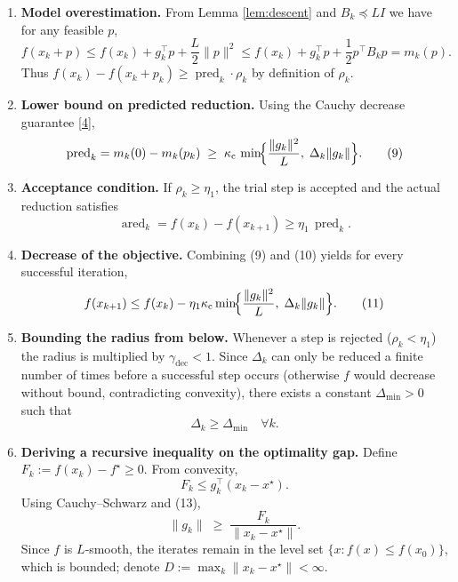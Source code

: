 \documentclass{article}
\begin{document}
\begin{enumerate}
\item[Step 1.] \textbf{Model overestimation.}  
From Lemma \ref{lem:descent} and $B_k\preceq L I$ we have for any feasible $p$,
\[
f(x_k+p)\le f(x_k)+g_k^{\top}p+\frac{L}{2}\|p\|^{2}
               \le f(x_k)+g_k^{\top}p+\frac12 p^{\top}B_k p
               = m_k(p).
\tag{8}
\]
Thus $f(x_k)-f(x_k+p_k)\ge \operatorname{pred}_k\cdot\rho_k$ by definition of $\rho_k$.

\item[Step 2.] \textbf{Lower bound on predicted reduction.}  
Using the Cauchy decrease guarantee \eqref{4},
\[
\operatorname{pred}_k
= m_k(0)-m_k(p_k)
\;\ge\; \kappa_{\mathrm{c}}\,
\min\!\Bigl\{\frac{\|g_k\|^{2}}{L},\;\Delta_k\|g_k\|\Bigr\}.
\tag{9}
\]

\item[Step 3.] \textbf{Acceptance condition.}  
If $\rho_k\ge \eta_1$, the trial step is accepted and the actual reduction satisfies
\[
\operatorname{ared}_k
= f(x_k)-f(x_{k+1})
\ge \eta_1\,\operatorname{pred}_k.
\tag{10}
\]

\item[Step 4.] \textbf{Decrease of the objective.}  
Combining (9) and (10) yields for every successful iteration,
\[
f(x_{k+1})\le f(x_k)-\eta_1\kappa_{\mathrm{c}}
\min\!\Bigl\{\frac{\|g_k\|^{2}}{L},\;\Delta_k\|g_k\|\Bigr\}.
\tag{11}
\]

\item[Step 5.] \textbf{Bounding the radius from below.}  
Whenever a step is rejected ($\rho_k<\eta_1$) the radius is multiplied by $\gamma_{\text{dec}}<1$. Since $\Delta_k$ can only be reduced a finite number of times before a successful step occurs (otherwise $f$ would decrease without bound, contradicting convexity), there exists a constant $\Delta_{\min}>0$ such that
\[
\Delta_k\ge \Delta_{\min}\quad\forall k.
\tag{12}
\]

\item[Step 6.] \textbf{Deriving a recursive inequality on the optimality gap.}  
Define $F_k:=f(x_k)-f^\star\ge0$. From convexity,
\[
F_k\le g_k^{\top}(x_k-x^\star).
\tag{13}
\]
Using Cauchy–Schwarz and (13),
\[
\|g_k\|\;\ge\;\frac{F_k}{\|x_k-x^\star\|}.
\tag{14}
\]
Since $f$ is $L$‑smooth, the iterates remain in the level set $\{x: f(x)\le f(x_0)\}$, which is bounded; denote $D:=\max_k\|x_k-x^\star\|<\infty$.


\end{enumerate}
\end{document}
